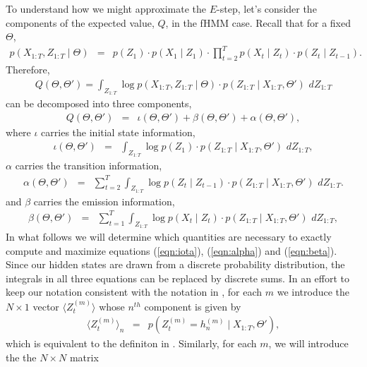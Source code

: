\documentclass{amsart}
\begin{document}
To understand how we might approximate the $E$-step, let's consider the components of the expected value, $Q$, in the fHMM case.  Recall that for a fixed $\Theta$,  
\begin{eqnarray}\label{eqn:1}
p(X_{1:T},Z_{1:T}\mid \Theta) & = & p(Z_1)\cdot p(X_1\mid Z_1)\cdot 
\prod_{t=2}^Tp(X_t\mid Z_t)\cdot p(Z_t\mid Z_{t-1}).  
\end{eqnarray}
Therefore, 
\begin{eqnarray*}
Q(\Theta,\Theta') = \int_{Z_{1:T}}\log p(X_{1:T},Z_{1:T}\mid \Theta) 
\cdot p(Z_{1:T}\mid X_{1:T},\Theta')\,\,dZ_{1:T}
\end{eqnarray*}
can be decomposed into three components, 
\begin{eqnarray*}
Q(\Theta,\Theta') &=& \iota(\Theta,\Theta')+\beta(\Theta,\Theta')+\alpha(\Theta,\Theta'), 
\end{eqnarray*}
where $\iota$ carries the initial state information,
\begin{eqnarray}\label{eqn:iota}
\iota(\Theta,\Theta') &=& \int_{Z_{1:T}}\log p(Z_1)\cdot p(Z_{1:T}\mid 
X_{1:T},\Theta')\,\,dZ_{1:T},
\end{eqnarray}
$\alpha$ carries the transition information,
\begin{eqnarray}\label{eqn:alpha}
\alpha(\Theta,\Theta') &=& \sum_{t=2}^T\int_{Z_{1:T}}\log p(Z_t\mid 
Z_{t-1})\cdot p(Z_{1:T}\mid X_{1:T},\Theta')\,\,dZ_{1:T}.
\end{eqnarray}
and $\beta$ carries the emission information,
\begin{eqnarray}\label{eqn:beta}
\beta(\Theta,\Theta') &=& \sum_{t=1}^T\int_{Z_{1:T}}\log p(X_t\mid 
Z_t)\cdot p(Z_{1:T}\mid X_{1:T},\Theta')\,\,dZ_{1:T},
\end{eqnarray}
In what follows we will determine which quantities are necessary to exactly 
compute and maximize equations (\ref{eqn:iota}), (\ref{eqn:alpha}) and (\ref{eqn:beta}).  
Since our hidden states are drawn from a discrete probability distribution, the integrals 
in all three equations can be replaced by discrete sums.  In an effort 
to keep our notation consistent with the notation in \cite{GJ95}, for 
each $m$ we 
introduce the $N\times 1$ vector $\langle Z_t^{(m)}\rangle$ whose 
$n^{th}$ component is given by 
\begin{eqnarray}\label{eqn:bracket1}
\langle Z_t^{(m)}\rangle_n &=& p\left(Z_t^{(m)}=h_n^{(m)}\mid 
X_{1:T},\Theta'\right),
\end{eqnarray}
which is equivalent to the definiton in
\cite[Appendix B]{GJ95}. Similarly, for each $m$, we will introduce the the $N\times N$ matrix 
\end{document}
